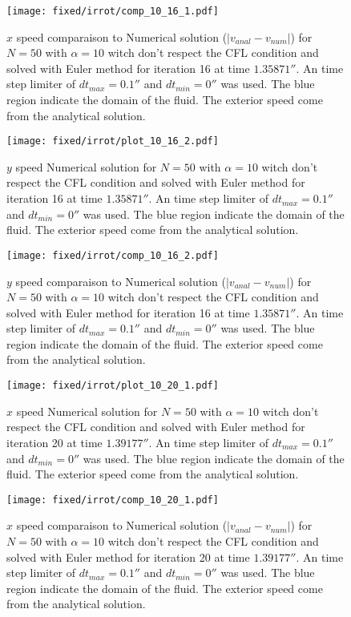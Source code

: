 \begin{figure}
\texttt{[image: fixed/irrot/comp\_10\_16\_1.pdf]}
\caption{$x$ speed comparaison to Numerical solution ($|v_{anal}-v_{num}|$) for $N=50$ with $\alpha=10$ witch don't respect the CFL condition and solved with Euler method
for iteration 16 at time $\unit{1.35871}{\second}$.
An time step limiter of $dt_{max}=\unit{0.1}{\second}$ and $dt_{min}=\unit{0}{\second}$ was used.
The blue region indicate the domain of the fluid. The exterior speed come from the analytical solution.
\label{fix:comp_10_16_1}
}
\end{figure}

\clearpage

\begin{figure}
\texttt{[image: fixed/irrot/plot\_10\_16\_2.pdf]}
\caption{$y$ speed Numerical solution for $N=50$ with $\alpha=10$ witch don't respect the CFL condition and solved with Euler method
for iteration 16 at time $\unit{1.35871}{\second}$.
An time step limiter of $dt_{max}=\unit{0.1}{\second}$ and $dt_{min}=\unit{0}{\second}$ was used.
The blue region indicate the domain of the fluid. The exterior speed come from the analytical solution.
\label{fix:plot_10_16_2}
}
\end{figure}

\begin{figure}
\texttt{[image: fixed/irrot/comp\_10\_16\_2.pdf]}
\caption{$y$ speed comparaison to Numerical solution ($|v_{anal}-v_{num}|$) for $N=50$ with $\alpha=10$ witch don't respect the CFL condition and solved with Euler method
for iteration 16 at time $\unit{1.35871}{\second}$.
An time step limiter of $dt_{max}=\unit{0.1}{\second}$ and $dt_{min}=\unit{0}{\second}$ was used.
The blue region indicate the domain of the fluid. The exterior speed come from the analytical solution.
\label{fix:comp_10_16_2}
}
\end{figure}

\begin{figure}
\texttt{[image: fixed/irrot/plot\_10\_20\_1.pdf]}
\caption{$x$ speed Numerical solution for $N=50$ with $\alpha=10$ witch don't respect the CFL condition and solved with Euler method
for iteration 20 at time $\unit{1.39177}{\second}$.
An time step limiter of $dt_{max}=\unit{0.1}{\second}$ and $dt_{min}=\unit{0}{\second}$ was used.
The blue region indicate the domain of the fluid. The exterior speed come from the analytical solution.
\label{fix:plot_10_20_1}
}
\end{figure}

\begin{figure}
\texttt{[image: fixed/irrot/comp\_10\_20\_1.pdf]}
\caption{$x$ speed comparaison to Numerical solution ($|v_{anal}-v_{num}|$) for $N=50$ with $\alpha=10$ witch don't respect the CFL condition and solved with Euler method
for iteration 20 at time $\unit{1.39177}{\second}$.
An time step limiter of $dt_{max}=\unit{0.1}{\second}$ and $dt_{min}=\unit{0}{\second}$ was used.
The blue region indicate the domain of the fluid. The exterior speed come from the analytical solution.
\label{fix:comp_10_20_1}
}
\end{figure}

